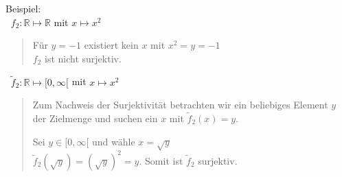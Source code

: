 Beispiel:\\
\textbullet $\;\;f_2:\mathbb{R}\longmapsto\mathbb{R}$ mit $x\longmapsto x^2$\\
\begin{quote}
	Für $y=-1$ existiert kein $x$ mit $x^2=y=-1$\\
	$f_2$ ist nicht surjektiv.\vspace*{2mm}\\
\end{quote}
\pagebreak
\textbullet$\;\;\widetilde{f}_2: \mathbb{R}\longmapsto [0,\infty[$ mit $x\longmapsto x^2$\\
\begin{quote}
	Zum Nachweis der Surjektivität betrachten wir ein beliebiges Element $y$ der Zielmenge und suchen ein $x$ mit $\widetilde{f}_2(x)=y$.
	
	Sei $y\in [0,\infty[$ und wähle $ x=\sqrt{y} $\\
	$\widetilde{f}_2(\sqrt{y})=(\sqrt{y})^2=y$. Somit ist $\widetilde{f}_2$ surjektiv.
	
\end{quote}

